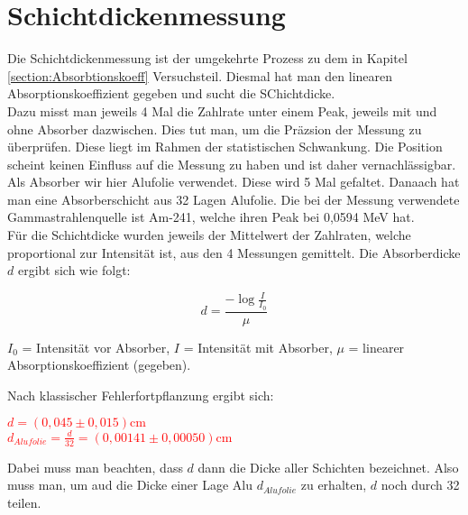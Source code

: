 \section{Schichtdickenmessung}

Die Schichtdickenmessung ist der umgekehrte Prozess zu dem in Kapitel \ref{section:Absorbtionskoeff} Versuchsteil. Diesmal hat man den linearen Absorptionskoeffizient gegeben und 
sucht die SChichtdicke.\\
Dazu misst man jeweils 4 Mal die Zahlrate unter einem Peak, jeweils mit und ohne Absorber dazwischen. Dies tut man, um die Präzsion der Messung zu überprüfen. Diese liegt im Rahmen der 
statistischen Schwankung. Die Position scheint keinen Einfluss auf die Messung zu haben und ist daher vernachlässigbar. Als Absorber wir hier Alufolie verwendet. Diese wird 
5 Mal gefaltet. Danaach hat man eine Absorberschicht aus 32 Lagen Alufolie. Die bei der Messung verwendete Gammastrahlenquelle ist Am-241, welche ihren Peak bei 0,0594 MeV hat. \\

Für die Schichtdicke wurden jeweils der Mittelwert der Zahlraten, welche proportional zur Intensität ist, aus den 4 Messungen gemittelt. Die Absorberdicke $d$ ergibt sich wie folgt:

\begin{equation}
    d = \frac{-\log{\frac{I}{I_0}}}{\mu}
\end{equation}

$I_0$ = Intensität vor Absorber, $I$ = Intensität mit Absorber, $\mu$ = linearer Absorptionskoeffizient (gegeben).

Nach klassischer Fehlerfortpflanzung ergibt sich:

\begin{center}
    \centering
    \textcolor{red}{$ d = (0,045\pm0,015) \mathrm{cm}$}\\
    \textcolor{red}{$ d_{Alufolie} = \frac{d}{32} = (0,00141\pm0,00050) \mathrm{cm}$}\\
\end{center}

Dabei muss man beachten, dass $d$ dann die Dicke aller Schichten bezeichnet. Also muss man, um aud die Dicke einer Lage Alu $d_{Alufolie}$ zu erhalten, 
$d$ noch durch 32 teilen.